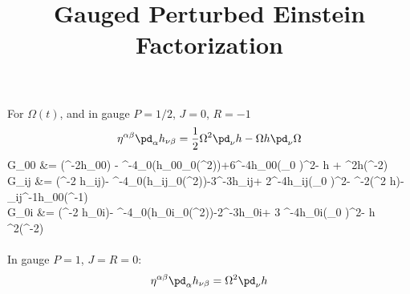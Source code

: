 \documentclass[10pt,letterpaper]{article}
\title{Gauged Perturbed Einstein Factorization}
\author{}
\date{}
\begin{document}
\maketitle 
\noindent For $\Omega(t)$,
and  
in gauge $P=1/2$, $J=0$, $R=-1$
\[
	\eta^{\alpha\beta} \pd_\alpha h_{\nu\beta} = \frac12\Omega^2 \pd_\nu h - \Omega h \pd_\nu \Omega
\]
\ba
	\delta G_{00} 	&=   \Box(\Omega^{-2}h_{00}) - \Omega^{-4}\pd_0(h_{00}\pd_0(\Omega^2))+6\Omega^{-4}h_{00}(\pd_0 \Omega)^2- \Box h +  \Omega^2h\Box (\Omega^{-2}) \\
	\delta G_{ij} &=   \Box(\Omega^{-2} h_{ij})- \Omega^{-4}\pd_0(h_{ij}\pd_0(\Omega^2))-3\Omega^{-3}h_{ij}\Box\Omega + 2\Omega^{-4}h_{ij}(\pd_0 \Omega)^2- \Omega^{-2}\Box(\Omega^2 h)-\delta_{ij}\Omega^{-1}h_{00}\Box(\Omega^{-1})\\
	\delta G_{0i} &=   \Box(\Omega^{-2} h_{0i})- \Omega^{-4}\pd_0(h_{0i}\pd_0(\Omega^2))-2\Omega^{-3}h_{0i}\Box \Omega + 3 \Omega^{-4}h_{0i}(\pd_0 \Omega)^2- h \Omega^{2}\Box(\Omega^{-2})
\ea
\\ \\
In gauge $P=1$, $J=R=0$:
\[
	\eta^{\alpha\beta} \pd_\alpha h_{\nu\beta} = \Omega^2 \pd_\nu h
\]
\end{document}
